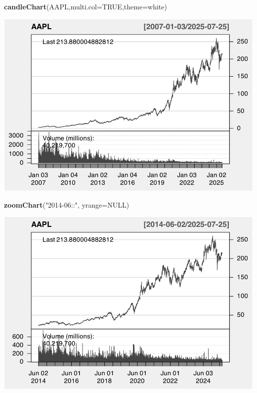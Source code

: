 \documentclass[]{ctexbook}
\newenvironment{Shaded}{\begin{snugshade}}{\end{snugshade}}
\newcommand{\AttributeTok}[1]{\textcolor[rgb]{0.13,0.29,0.53}{#1}}
\newcommand{\ConstantTok}[1]{\textcolor[rgb]{0.56,0.35,0.01}{#1}}
\newcommand{\FunctionTok}[1]{\textcolor[rgb]{0.13,0.29,0.53}{\textbf{#1}}}
\newcommand{\NormalTok}[1]{#1}
\newcommand{\StringTok}[1]{\textcolor[rgb]{0.31,0.60,0.02}{#1}}
\begin{document}
\begin{Shaded}
\begin{Highlighting}[]
\FunctionTok{candleChart}\NormalTok{(AAPL,}\AttributeTok{multi.col=}\ConstantTok{TRUE}\NormalTok{,}\AttributeTok{theme=}\StringTok{\textquotesingle{}white\textquotesingle{}}\NormalTok{) }
\end{Highlighting}
\end{Shaded}

\includegraphics[width=0.9\linewidth]{QuantmodHandbook_files/figure-latex/zoomMonth-1}

\begin{Shaded}
\begin{Highlighting}[]
\FunctionTok{zoomChart}\NormalTok{(}\StringTok{"2014{-}06::"}\NormalTok{, }\AttributeTok{yrange=}\ConstantTok{NULL}\NormalTok{)}
\end{Highlighting}
\end{Shaded}

\includegraphics[width=0.9\linewidth]{QuantmodHandbook_files/figure-latex/zoomMonth-2}
\end{document}
